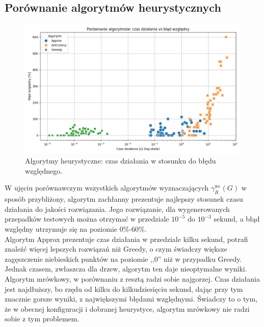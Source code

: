 \subsection{Porównanie algorytmów heurystycznych}

\begin{figure}[H]
    \centering
    \includegraphics[width=\textwidth]{assets/plots_approx/alorithms.png}
    \caption{Algorytmy heurystyczne: czas działania w stosunku do błędu względnego.}
    \label{fig:approxPlot}
\end{figure}

W ujęciu porównawczym wszystkich algorytmów wyznaczających $\gamma^{\text{wc}}_R(G)$ w sposób przybliżony, algorytm zachłanny prezentuje najlepszy stosunek czasu działania do jakości rozwiązania. Jego rozwiązanie, dla wygenerowanych przepadków testowych można otrzymać w przedziale $10^{-5}$ do $10^{-3}$ sekund, a błąd względny utrzymuje się na poziomie 0\%-60\%.\\
Algorytm Approx prezentuje czas działania w przedziale kilku sekund, potrafi znaleźć więcej lepszych rozwiązań niż Greedy, o czym świadczy większe zagęszczenie niebieskich punktów na poziomie ,,0'' niż w przypadku Greedy. Jednak czasem, zwłaszcza dla drzew, algorytm ten daje nieoptymalne wyniki.\\
Algorytm mrówkowy, w porównaniu z resztą radzi sobie najgorzej. Czas działania jest najdłuższy, bo rzędu od kilku do kilkudziesięciu sekund, dając przy tym znacznie gorsze wyniki, z największymi błędami względnymi. Świadczy to o tym, że w obecnej konfiguracji i dobranej heurystyce, algorytm mrówkowy nie radzi sobie z tym problemem.